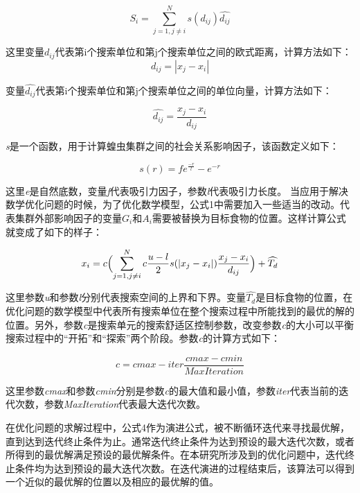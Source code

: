 \begin{equation}
    S_i = \sum_{j=1, j\neq{i}}^N s(d_{ij})\widehat{d_{ij}}
\end{equation}

这里变量$d_{ij}$代表第i个搜索单位和第j个搜索单位之间的欧式距离，计算方法如下：
\begin{equation}
    d_{ij}=|x_j-x_i|
\end{equation}

变量$\widehat{d_{ij}}$代表第i个搜索单位和第j个搜索单位之间的单位向量，计算方法如下：

\begin{equation}
    \widehat{d_{ij}}=\frac{x_j-x_i}{d_{ij}}
\end{equation}

\emph{s}是一个函数，用于计算蝗虫集群之间的社会关系影响因子，该函数定义如下：

\begin{equation}
    s(r) = fe^{\frac{-r}{l}}-e^{-r}
\end{equation}

这里\emph{e}是自然底数，变量\emph{f}代表吸引力因子，参数\emph{l}代表吸引力长度。
当应用于解决数学优化问题的时候，为了优化数学模型，公式1中需要加入一些适当的改动。代表集群外部影响因子的变量$G_i$和$A_i$需要被替换为目标食物的位置。这样计算公式就变成了如下的样子：

\begin{equation}
    x_i = c \Bigl(\sum_{j=1,j\neq{i}}^N c \frac{u-l}{2}s (\lvert x_j-x_i \rvert )\frac{x_j-x_i}{d_{ij}} \Bigr) + \widehat{T_d}
\end{equation}

这里参数\emph{u}和参数\emph{l}分别代表搜索空间的上界和下界。变量$\widehat{T_d}$是目标食物的位置，在优化问题的数学模型中代表所有搜索单位在整个搜索过程中所能找到的最优的解的位置。另外，参数\emph{c}是搜索单元的搜索舒适区控制参数，改变参数\emph{c}的大小可以平衡搜索过程中的“开拓”和“探索”两个阶段。参数\emph{c}的计算方式如下：

\begin{equation}
    c = cmax - iter \frac{cmax - cmin}{MaxIteration}
\end{equation}


这里参数\emph{cmax}和参数\emph{cmin}分别是参数\emph{c}的最大值和最小值，参数\emph{iter}代表当前的迭代次数，参数\emph{MaxIteration}代表最大迭代次数。

在优化问题的求解过程中，公式4作为演进公式，被不断循环迭代来寻找最优解，直到达到迭代终止条件为止。通常迭代终止条件为达到预设的最大迭代次数，或者所得到的最优解满足预设的最优解条件。在本研究所涉及到的优化问题中，迭代终止条件均为达到预设的最大迭代次数。在迭代演进的过程结束后，该算法可以得到一个近似的最优解的位置以及相应的最优解的值。

